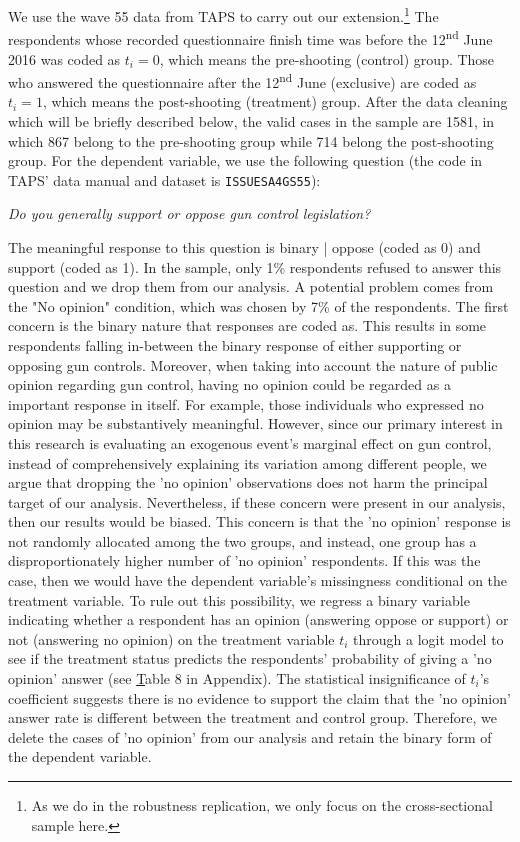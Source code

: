 \documentclass[11pt]{article}
\begin{document}
We use the wave 55 data from TAPS to carry out our extension.\footnote{As we do in the robustness replication, we only focus on the cross-sectional sample here.} The respondents whose recorded questionnaire finish time was before the 12\textsuperscript{nd} June 2016 was coded as \(t_i = 0\), which means the pre-shooting (control) group. Those who answered the questionnaire after the 12\textsuperscript{nd} June (exclusive) are coded as \(t_i = 1\), which means the post-shooting (treatment) group. After the data cleaning which will be briefly described below, the valid cases in the sample are 1581, in which 867 belong to the pre-shooting group while 714 belong the post-shooting group. For the dependent variable, we use the following question (the code in TAPS’ data manual and dataset is \texttt{ISSUESA4GS55}): 
\begin{displayquote}
\itshape
Do you generally support or oppose gun control legislation?
\end{displayquote}
The meaningful response to this question is binary | oppose (coded as 0) and support (coded as 1). In the sample, only 1\% respondents refused to answer this question and we drop them from our analysis. A potential problem comes from the "No opinion" condition, which was chosen by 7\% of the respondents. The first concern is the binary nature that responses are coded as. This results in some respondents falling in-between the binary response of either supporting or opposing gun controls. Moreover, when taking into account the nature of public opinion regarding gun control, having no opinion could be regarded as a important response in itself. For example, those individuals who expressed no opinion may be substantively meaningful. However, since our primary interest in this research is evaluating an exogenous event’s marginal effect on gun control, instead of comprehensively explaining its variation among different people, we argue that dropping the 'no opinion' observations does not harm the principal target of our analysis. Nevertheless, if these concern were present in our analysis, then our results would be biased. This concern is that the 'no opinion' response is not randomly allocated among the two groups, and instead, one group has a disproportionately higher number of 'no opinion' respondents. If this was the case, then we would have the dependent variable’s missingness conditional on the treatment variable. To rule out this possibility, we regress a binary variable indicating whether a respondent has an opinion (answering oppose or support) or not (answering no opinion) on the treatment variable \(t_i\) through a logit model to see if the treatment status predicts the respondents’ probability of giving a 'no opinion' answer (see \hyperref[atab6] Table 8 in Appendix). The statistical insignificance of \(t_i\)’s coefficient suggests there is no evidence to support the claim that the 'no opinion' answer rate is different between the treatment and control group. Therefore, we delete the cases of 'no opinion' from our analysis and retain the binary form of the dependent variable. 
\end{document}
